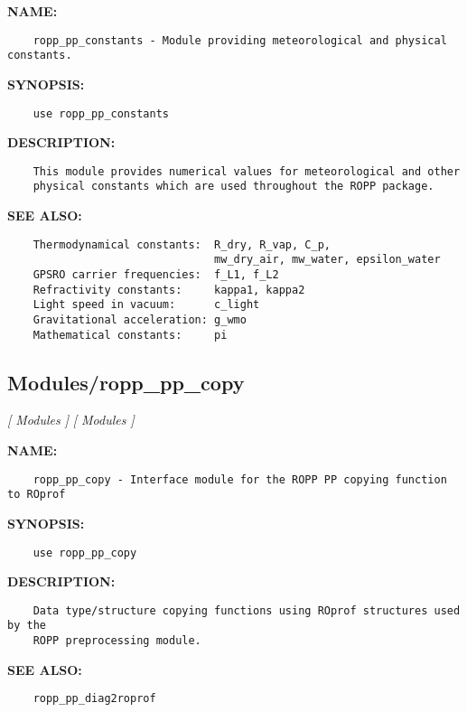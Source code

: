 \label{ch:robo43}
\label{ch:Modules_ropp_pp_constants}
\textbf{NAME:}\hspace{0.08in}\begin{Verbatim}
    ropp_pp_constants - Module providing meteorological and physical constants.
\end{Verbatim}
\textbf{SYNOPSIS:}\hspace{0.08in}\begin{Verbatim}
    use ropp_pp_constants
\end{Verbatim}
\textbf{DESCRIPTION:}\hspace{0.08in}\begin{Verbatim}
    This module provides numerical values for meteorological and other
    physical constants which are used throughout the ROPP package.
\end{Verbatim}
\textbf{SEE ALSO:}\hspace{0.08in}\begin{Verbatim}
    Thermodynamical constants:  R_dry, R_vap, C_p,
                                mw_dry_air, mw_water, epsilon_water
    GPSRO carrier frequencies:  f_L1, f_L2
    Refractivity constants:     kappa1, kappa2
    Light speed in vacuum:      c_light
    Gravitational acceleration: g_wmo 
    Mathematical constants:     pi
\end{Verbatim}
\subsection{Modules/ropp\_pp\_copy}
\textsl{[ Modules ]}
\textsl{[ Modules ]}

\label{ch:robo44}
\label{ch:Modules_ropp_pp_copy}
\textbf{NAME:}\hspace{0.08in}\begin{Verbatim}
    ropp_pp_copy - Interface module for the ROPP PP copying function to ROprof
\end{Verbatim}
\textbf{SYNOPSIS:}\hspace{0.08in}\begin{Verbatim}
    use ropp_pp_copy
\end{Verbatim}
\textbf{DESCRIPTION:}\hspace{0.08in}\begin{Verbatim}
    Data type/structure copying functions using ROprof structures used by the
    ROPP preprocessing module.
\end{Verbatim}
\textbf{SEE ALSO:}\hspace{0.08in}\begin{Verbatim}
    ropp_pp_diag2roprof
\end{Verbatim}
